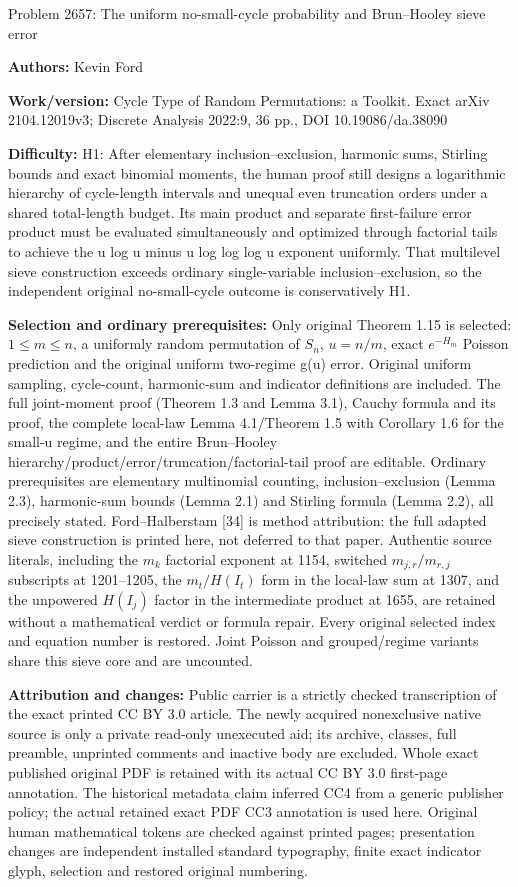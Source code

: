 \documentclass[10pt]{article}
\renewcommand{\le}{\leqslant}
\renewcommand{\(}{\left(}
\renewcommand{\)}{\right)}
\begin{document}
\begin{center}\Large Problem 2657: The uniform no-small-cycle probability and Brun--Hooley sieve error\end{center}
\noindent\textbf{Authors:} Kevin Ford\par
\noindent\textbf{Work/version:} Cycle Type of Random Permutations: a Toolkit. Exact arXiv 2104.12019v3; Discrete Analysis 2022:9, 36 pp., DOI 10.19086/da.38090\par
\noindent\textbf{Difficulty:} H1: After elementary inclusion--exclusion, harmonic sums, Stirling bounds and exact binomial moments, the human proof still designs a logarithmic hierarchy of cycle-length intervals and unequal even truncation orders under a shared total-length budget. Its main product and separate first-failure error product must be evaluated simultaneously and optimized through factorial tails to achieve the u log u minus u log log log u exponent uniformly. That multilevel sieve construction exceeds ordinary single-variable inclusion--exclusion, so the independent original no-small-cycle outcome is conservatively H1.\par
\noindent\textbf{Selection and ordinary prerequisites:} Only original Theorem 1.15 is selected: $1\le m\le n$, a uniformly random permutation of $S_n$, $u=n/m$, exact $e^{-H_m}$ Poisson prediction and the original uniform two-regime g(u) error. Original uniform sampling, cycle-count, harmonic-sum and indicator definitions are included. The full joint-moment proof (Theorem 1.3 and Lemma 3.1), Cauchy formula and its proof, the complete local-law Lemma 4.1/Theorem 1.5 with Corollary 1.6 for the small-u regime, and the entire Brun--Hooley hierarchy/product/error/truncation/factorial-tail proof are editable. Ordinary prerequisites are elementary multinomial counting, inclusion--exclusion (Lemma 2.3), harmonic-sum bounds (Lemma 2.1) and Stirling formula (Lemma 2.2), all precisely stated. Ford--Halberstam [34] is method attribution: the full adapted sieve construction is printed here, not deferred to that paper. Authentic source literals, including the $m_k$ factorial exponent at 1154, switched $m_{j,r}/m_{r,j}$ subscripts at 1201--1205, the $m_t/H(I_t)$ form in the local-law sum at 1307, and the unpowered $H(I_j)$ factor in the intermediate product at 1655, are retained without a mathematical verdict or formula repair. Every original selected index and equation number is restored. Joint Poisson and grouped/regime variants share this sieve core and are uncounted.\par
\noindent\textbf{Attribution and changes:} Public carrier is a strictly checked transcription of the exact printed CC BY 3.0 article. The newly acquired nonexclusive native source is only a private read-only unexecuted aid; its archive, classes, full preamble, unprinted comments and inactive body are excluded. Whole exact published original PDF is retained with its actual CC BY 3.0 first-page annotation. The historical metadata claim inferred CC4 from a generic publisher policy; the actual retained exact PDF CC3 annotation is used here. Original human mathematical tokens are checked against printed pages; presentation changes are independent installed standard typography, finite exact indicator glyph, selection and restored original numbering.\par
\end{document}

